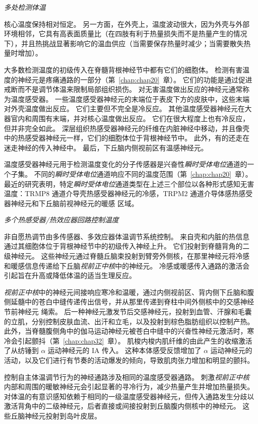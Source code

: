 \textit{多处检测体温}

核心温度保持相对恒定。
另一方面，在外壳上，温度波动很大，因为外壳与外部环境相邻，它具有高表面质量比（在四肢有利于热量损失而不是热量产生的情况下），并且热挑战显著影响它的温血供应（当需要保存热量时减少；当需要散失热量时增加）。


大多数检测温度的初级传入在脊髓背根神经节中都有它们的细胞体。
检测有害温度的神经元是疼痛通路的一部分（第~\ref{chap:chap20}~章）。
它们的功能是通过促进戒断而不是调节体温来限制局部组织损伤。
对无害温度做出反应的神经元通常称为温度感受器。
一些温度感受器神经元的末端位于表皮下方的皮肤中，这些末端对外壳温度做出反应。
它们主要但不完全是冷反应。 其他温度感受器神经元在大器官内和周围有末端，并对核心温度做出反应。
它们在很大程度上也有冷反应，但并非完全如此。
深层组织热感受器神经元的纤维在内脏神经中移动，并且像壳中的热感受器神经元一样，它们的细胞体位于背根神经节中。
此外，有的还走在迷走神经的传入神经中。 最后，下丘脑内侧视前区有温感神经元。


温度感受器神经元用于检测温度变化的分子传感器是兴奋性\textit{瞬时受体电位}通道的一个子集。
不同的\textit{瞬时受体电位}通道响应不同的温度范围（第~\ref{chap:chap20}~章）。
最近的研究表明，特定\textit{瞬时受体电位}通道类型在上述三个部位以各种形式感知无害温度：TRMP8 通道介导壳热感受器神经元的冷感，TRPM2 通道介导体感热感受器神经元和下丘脑前视神经元的暖感 区域。


\textit{多个热感受器/热效应器回路控制温度}

非自愿热调节由多传感器、多效应器体温调节系统控制。
来自壳和内脏的热信息通过其细胞体位于背根神经节中的初级传入神经上升。
它们投射到脊髓背角的二级神经元。
这些神经元通过脊髓丘脑束投射到臂旁外侧核，在那里神经元将冷感和暖感信息传递给下丘脑\textit{视前正中核}中的神经元。
冷感或暖感传入通路的激活会引起旨在升高或降低体温的适当生理反应。


\textit{视前正中核}中的神经元间接响应寒冷和温暖，通过内侧视前区、背内侧下丘脑和腹侧延髓中的苍白中缝传递传出信号，并从那里传递到脊柱中间外侧核中的交感神经节前神经元 绳索。
后一种神经元激发节后交感神经元，投射到血管、汗腺和毛囊的立肌，分别控制皮肤血流、出汗和立毛，以及投射到棕色脂肪组织以控制产热。
此外，当脊髓腹侧角中的伽马运动神经元被苍白中缝中的兴奋性神经元激活时，寒冷会引起颤抖（第~\ref{chap:chap32}~章）。
肌梭内梭内肌纤维的由此产生的收缩激活了从纺锤到 $ \alpha $ 运动神经元的 IA 传入。
这种本体感受反馈增加了 $ \alpha $ 运动神经元的活动，以及它们进行有节奏的活动爆发的倾向，导致肌肉张力增加和明显的颤抖。


控制自主体温调节行为的神经通路涉及相同的温度感受器通路。
刺激\textit{视前正中核}内部和周围的暖敏神经元会引起显著的寻冷行为，减少热量产生并增加热量损失。
对体温的有意识感知依赖于相同的一级温度感受器神经元，但传入通路发生分歧以激活背角中的二级神经元，后者直接或间接投射到丘脑腹内侧核中的神经元。
这些丘脑神经元投射到岛叶皮层。


